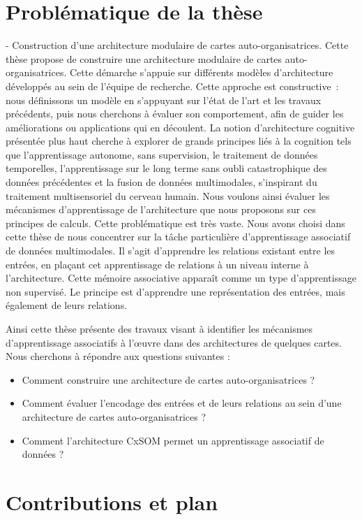 \section*{Problématique de la thèse}


- Construction d'une architecture modulaire de cartes auto-organisatrices. 
Cette thèse propose de construire une architecture modulaire de cartes auto-organisatrices. Cette démarche s'appuie sur différents modèles d'architecture développés au sein de l'équipe de recherche.
Cette approche est constructive~: nous définissons un modèle en s'appuyant sur l'état de l'art et les travaux précédents, puis nous cherchons à évaluer son comportement, afin de guider les améliorations ou applications qui en découlent.
La notion d'architecture cognitive présentée plus haut cherche à explorer de grands principes liés à la cognition tels que l'apprentissage autonome, sans supervision, le traitement de données temporelles, l'apprentissage sur le long terme sans oubli catastrophique des données précédentes et la fusion de données multimodales, s'inspirant du traitement multisensoriel du cerveau humain.
Nous voulons ainsi évaluer les mécanismes d'apprentissage de l'architecture que nous proposons sur ces principes de calculs. 
Cette problématique est très vaste.
Nous avons choisi dans cette thèse de nous concentrer sur la tâche particulière d'apprentissage associatif de données multimodales. 
Il s'agit d'apprendre les relations existant entre les entrées, en plaçant cet apprentissage de relations à un niveau interne à l'architecture.
Cette mémoire associative apparaît comme un type d'apprentissage non supervisé. Le principe est d'apprendre une représentation des entrées, mais également de leurs relations.


Ainsi cette thèse présente des travaux visant à identifier les mécanismes d'apprentissage associatifs à l'\oe{}uvre dans des architectures de quelques cartes.
Nous cherchons à répondre aux questions suivantes :
\begin{itemize}
    \item Comment construire une architecture de cartes auto-organisatrices ?
    \item Comment évaluer l'encodage des entrées et de leurs relations au sein d'une architecture de cartes auto-organisatrices ?
    \item Comment l'architecture CxSOM permet un apprentissage associatif de données ?
\end{itemize}


\section*{Contributions et plan}


